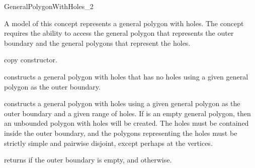 \ccRefPageBegin
 
\def\ccLongParamLayout{\ccFalse}
\begin{ccRefConcept}{GeneralPolygonWithHoles_2}


\ccRefines

\ccTypes
\ccThreeToTwo




\ccDefinition
A model of this concept represents a general polygon with holes. The
concept requires the ability to access the general polygon that
represents the outer boundary and the general polygons that represent
the holes.

\ccThreeToTwo

\ccCreation
{}

\ccGlue
{}
{copy constructor.}
\ccGlue
{}

{constructs a general polygon with holes that has no holes using a given general polygon  as the outer boundary.}

{constructs a general polygon with holes using a given general polygon 
as the outer boundary and a given range of holes. If  is an empty
general polygon, then an unbounded polygon with holes will be created. The holes must be
contained inside the outer boundary, and the polygons representing the holes 
must be strictly simple and pairwise disjoint, except perhaps at the vertices.}

\ccPredicates
{returns  if the outer boundary is empty, and 
otherwise.}


\end{ccRefConcept}
